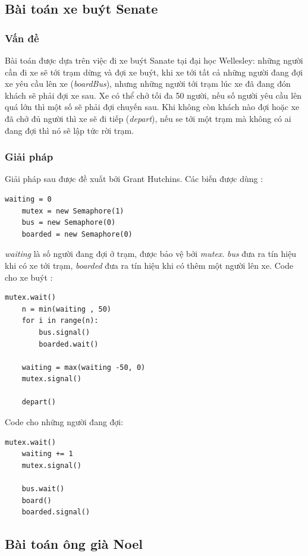 \documentclass[12pt]{article}
\begin{document}
\subsection{Bài toán xe buýt Senate}
	\subsubsection{Vấn đề}
	Bài toán được dựa trên việc đi xe buýt Sanate tại đại học Wellesley: những người cần đi xe sẽ tới trạm dừng và đợi xe buýt, khi xe tới tất cả những người đang đợi xe yêu cầu lên xe (\textit{boardBus}), nhưng những người tới trạm lúc xe đã đang đón khách sẽ phải đợi xe sau. Xe có thể chở tối đa 50 người, nếu số người yêu cầu lên quá lớn thì một số sẽ phải đợi chuyến sau. Khi không còn khách nào đợi hoặc xe đã chở đủ người thì xe sẽ đi tiếp (\textit{depart}), nếu se tới một trạm mà không có ai đang đợi thì nó sẽ lập tức rời trạm.
	\subsubsection{Giải pháp}
	Giải pháp sau được đề xuất bởi Grant Hutchins. Các biến được dùng :
	\begin{lstlisting}[style = Python]
	waiting = 0 
	mutex = new Semaphore(1) 
	bus = new Semaphore(0) 
	boarded = new Semaphore(0)
	\end{lstlisting}
	\textit{waiting} là số người đang đợi ở trạm, được bảo vệ bởi \textit{mutex}. \textit{bus} đưa ra tín hiệu khi có xe tới trạm, \textit{boarded} đưa ra tín hiệu khi có thêm một người lên xe.
\newpage
	Code cho xe buýt :
	\begin{lstlisting}[style = Python]
	mutex.wait() 
	n = min(waiting , 50) 
	for i in range(n): 
		bus.signal() 
		boarded.wait()
		
	waiting = max(waiting -50, 0) 
	mutex.signal()

	depart()
	\end{lstlisting}
	Code cho những người đang đợi:
	\begin{lstlisting}[style = Python]
	mutex.wait() 
	waiting += 1 
	mutex.signal()

	bus.wait() 
	board() 
	boarded.signal()
	\end{lstlisting}
\subsection{Bài toán ông già Noel}
\end{document}
